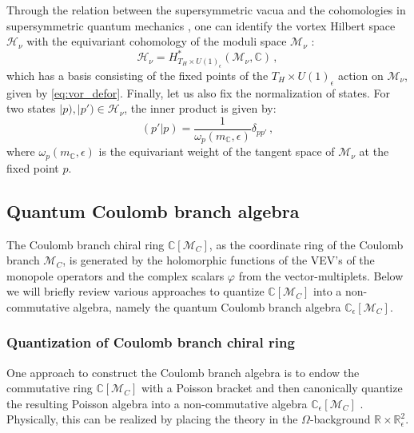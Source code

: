 \documentclass[12pt,a4paper]{article}
\renewcommand{\(}{\left(}
\renewcommand{\)}{\right)}
\newcommand{\eps}{\epsilon}
\renewcommand{\(}{\left(}
\renewcommand{\)}{\right)}
\begin{document}
Through the relation between the supersymmetric vacua and the cohomologies in supersymmetric quantum mechanics \cite{Witten:1982im}, one can identify the vortex Hilbert space $\mathcal{H}_\nu$ with the equivariant cohomology of the moduli space $\mathcal{M}_\nu$ \cite{Bullimore:2016hdc}:
\begin{equation}
\mathcal{H}_\nu=H^*_{T_{H}\times U(1)_\epsilon}(\mathcal{M}_\nu,\mathbb{C})\,,
\end{equation}
which has a basis consisting of the fixed points of the ${T_{H}\times U(1)_\epsilon}$ action on $\mathcal{M}_\nu$, given by \eqref{eq:vor_defor}. 
Finally, let us also fix the normalization of states. For two states $|p),|p')\in \mathcal{H}_\nu$, the inner product is given by:
\begin{equation}\label{eq:vortex_normal}
( p'|p)=\frac{1}{\omega_p(m_{\mathbb{C}},\epsilon)}\delta_{pp'}\,,
\end{equation}
where $\omega_p(m_{\mathbb{C}},\epsilon)$ is the equivariant weight of the tangent space of $\mathcal{M}_\nu$ at the fixed point $p$.


\subsection{Quantum Coulomb branch algebra}
\label{ssec:CBalgebra}


The Coulomb branch chiral ring $\mathbb{C}[\mathcal{M}_C]$, as the coordinate ring  of the Coulomb branch $\mathcal{M}_C$, is generated by the holomorphic functions of the VEV's of the monopole operators and the complex scalars $\varphi$ from the vector-multiplets. 
Below we will briefly review various approaches to quantize $\mathbb{C}[\mathcal{M}_C]$ into a non-commutative algebra, namely the quantum Coulomb branch algebra $\mathbb{C}_\eps[\mathcal{M}_C]$.


\subsubsection{Quantization of Coulomb branch chiral ring}
\label{sssec:DeformationQuantization}

One approach to construct the Coulomb branch algebra is to endow the commutative ring $\mathbb{C}[\mathcal{M}_C]$ with a Poisson bracket and then canonically quantize the resulting Poisson algebra into a non-commutative algebra $\mathbb{C}_\eps[\mathcal{M}_C]$ \cite{bullimore2015coulomb}.
Physically, this can be realized by placing the theory in the $\Omega$-background $\mathbb{R}\times \mathbb{R}^2_{\epsilon}$.
\end{document}
